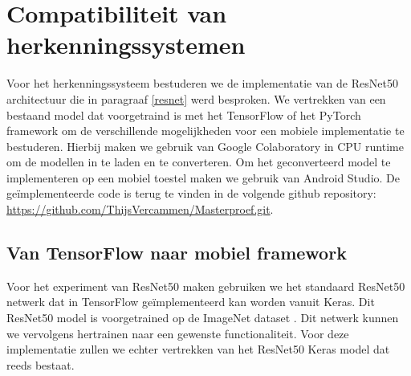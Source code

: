 \chapter{Compatibiliteit van herkenningssystemen}
Voor het herkenningssysteem bestuderen we de implementatie van de ResNet50 architectuur die in paragraaf \ref{resnet} werd besproken.
We vertrekken van een bestaand model dat voorgetraind is met het TensorFlow of het PyTorch framework om de verschillende mogelijkheden voor een mobiele implementatie te bestuderen.
Hierbij maken we gebruik van Google Colaboratory in CPU runtime om de modellen in te laden en te converteren.
Om het geconverteerd model te implementeren op een mobiel toestel maken we gebruik van Android Studio.
De ge\"implementeerde code is terug te vinden in de volgende github repository: \url{https://github.com/ThijsVercammen/Masterproef.git}.



\section{Van TensorFlow naar mobiel framework}
Voor het experiment van ResNet50 maken gebruiken we het standaard ResNet50 netwerk dat in TensorFlow ge\"implementeerd kan worden vanuit Keras.
Dit ResNet50 model is voorgetrained op de ImageNet dataset \cite{deng_2009_imagenet}. 
Dit netwerk kunnen we vervolgens hertrainen naar een gewenste functionaliteit.
Voor deze implementatie zullen we echter vertrekken van het ResNet50 Keras model dat reeds bestaat.

